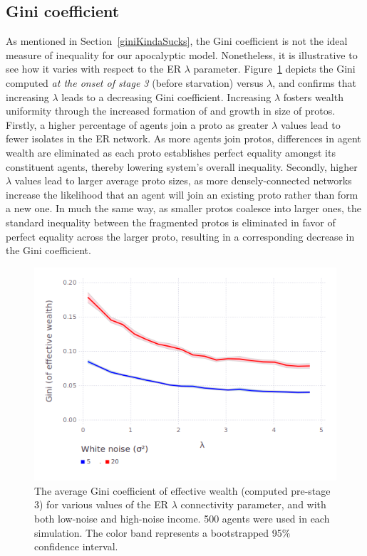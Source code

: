 \subsection{Gini coefficient}

As mentioned in Section~\ref{giniKindaSucks}, the Gini coefficient is not the ideal measure of inequality for our apocalyptic model. Nonetheless, it is illustrative to see how it varies with respect to the ER $\lambda$ parameter. Figure~\ref{fig:giniVsLambda} depicts the Gini computed \textit{at the onset of stage 3} (before starvation) versus $\lambda$, and confirms that increasing $\lambda$ leads to a decreasing Gini coefficient. Increasing $\lambda$ fosters wealth uniformity through the increased formation of and growth in size of protos. Firstly, a higher percentage of agents join a proto as greater $\lambda$ values lead to fewer isolates in the ER network. As more agents join protos, differences in agent wealth are eliminated as each proto establishes perfect equality amongst its constituent agents, thereby lowering system's overall inequality. Secondly, higher $\lambda$ values lead to larger average proto sizes, as more densely-connected networks increase the likelihood that an agent will join an existing proto rather than form a new one. In much the same way, as smaller protos coalesce into larger ones, the standard inequality between the fragmented protos is eliminated in favor of perfect equality across the larger proto, resulting in a corresponding decrease in the Gini coefficient. 

\begin{figure}[hb]
\centering
\includegraphics[width=\columnwidth]{figures/giniVsLambda.png}
\caption{The average Gini coefficient of effective wealth (computed pre-stage 3) for various values of the ER $\lambda$ connectivity parameter, and with both low-noise and high-noise income. 500 agents were used in each simulation. The color band represents a bootstrapped 95\% confidence interval.}
\label{fig:giniVsLambda}
\end{figure}

